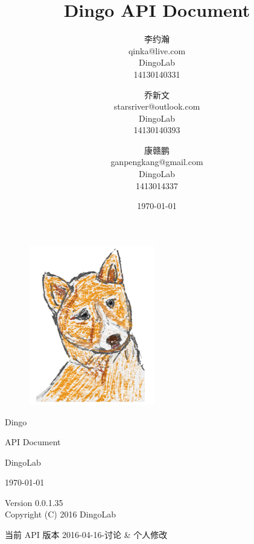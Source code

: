 \documentclass[UTF8]{article}
\author{ 李约瀚 \\ qinka@live.com \\ DingoLab \\ 14130140331 %
    \and 乔新文 \\ starsriver@outlook.com \\ DingoLab \\ 14130140393 %
    \and 康赣鹏 \\ ganpengkang@gmail.com \\ DingoLab \\ 1413014337 %
    }
\title{\Huge Dingo API Document}
\date{\mdydate\today}
\def\version{0.0.1.35}
\begin{document}
    \thispagestyle{empty} 
    {
    \label{page:cover}
    \hspace*{-10em} 
    \begin{figure}
        \includegraphics[width=5.5cm]{./Dingo-A}
    \end{figure}
    \begin{center}
        \vspace*{5em}
        {\hspace*{13em}\fontsize{90pt}{99pt}\selectfont Dingo}
    \end{center}
    \begin{center}
        \vspace*{2em}
        {\Huge API Document}
    \end{center}
    \vfill
    \begin{flushright}
        {\huge DingoLab}
    \end{flushright}
    \begin{flushright}
        {\Large \mydate\today}
    \end{flushright}
    }
    \label{page:title}
    \maketitle
    \thispagestyle{empty} 
    \vfill
    \begin{center}
        Version \version\\
        Copyright (C) 2016 DingoLab
    \end{center}
    \newpage
    \label{page:contents}
    \setcounter{page}{1}
    \tableofcontents
    \newpage
    \setcounter{page}{1}
    当前 API 版本 2016-04-16-讨论 \& 个人修改
\end{document}
